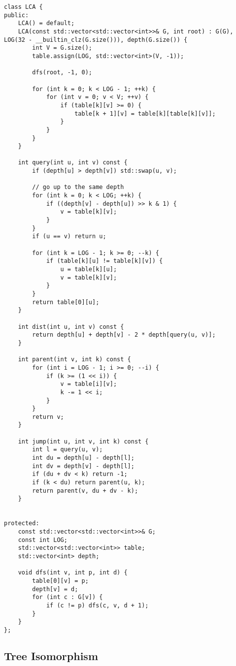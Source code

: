 \begin{lstlisting}
class LCA {
public:
    LCA() = default;
    LCA(const std::vector<std::vector<int>>& G, int root) : G(G), LOG(32 - __builtin_clz(G.size())), depth(G.size()) {
        int V = G.size();
        table.assign(LOG, std::vector<int>(V, -1));

        dfs(root, -1, 0);

        for (int k = 0; k < LOG - 1; ++k) {
            for (int v = 0; v < V; ++v) {
                if (table[k][v] >= 0) {
                    table[k + 1][v] = table[k][table[k][v]];
                }
            }
        }
    }

    int query(int u, int v) const {
        if (depth[u] > depth[v]) std::swap(u, v);

        // go up to the same depth
        for (int k = 0; k < LOG; ++k) {
            if ((depth[v] - depth[u]) >> k & 1) {
                v = table[k][v];
            }
        }
        if (u == v) return u;

        for (int k = LOG - 1; k >= 0; --k) {
            if (table[k][u] != table[k][v]) {
                u = table[k][u];
                v = table[k][v];
            }
        }
        return table[0][u];
    }

    int dist(int u, int v) const {
        return depth[u] + depth[v] - 2 * depth[query(u, v)];
    }

    int parent(int v, int k) const {
        for (int i = LOG - 1; i >= 0; --i) {
            if (k >= (1 << i)) {
                v = table[i][v];
                k -= 1 << i;
            }
        }
        return v;
    }

    int jump(int u, int v, int k) const {
        int l = query(u, v);
        int du = depth[u] - depth[l];
        int dv = depth[v] - depth[l];
        if (du + dv < k) return -1;
        if (k < du) return parent(u, k);
        return parent(v, du + dv - k);
    }


protected:
    const std::vector<std::vector<int>>& G;
    const int LOG;
    std::vector<std::vector<int>> table;
    std::vector<int> depth;

    void dfs(int v, int p, int d) {
        table[0][v] = p;
        depth[v] = d;
        for (int c : G[v]) {
            if (c != p) dfs(c, v, d + 1);
        }
    }
};
\end{lstlisting}

\subsection{Tree Isomorphism}

